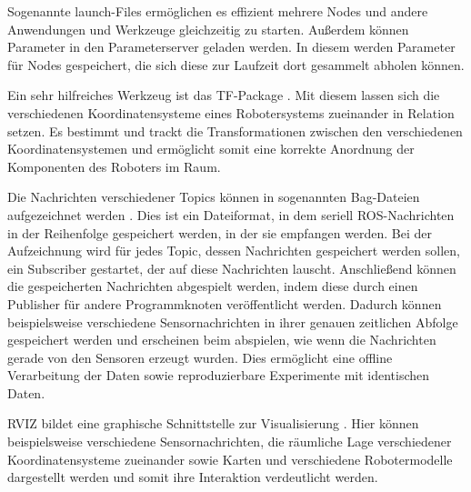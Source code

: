 Sogenannte launch-Files ermöglichen es effizient mehrere Nodes und andere Anwendungen und Werkzeuge gleichzeitig zu starten. Außerdem können Parameter in den Parameterserver geladen werden. In diesem werden Parameter für Nodes gespeichert, die sich diese zur Laufzeit dort gesammelt abholen können.

Ein sehr hilfreiches Werkzeug ist das TF-Package \cite{rostf2017}. Mit diesem lassen sich die verschiedenen Koordinatensysteme eines Robotersystems zueinander in Relation setzen. Es bestimmt und trackt die  Transformationen zwischen den verschiedenen Koordinatensystemen und ermöglicht somit eine korrekte Anordnung der Komponenten des Roboters im Raum. 

Die Nachrichten verschiedener Topics können in sogenannten Bag-Dateien auf\-ge\-zeich\-net werden \cite{rosbags2015}. Dies ist ein Dateiformat, in dem seriell ROS-Nachrichten in der Reihenfolge gespeichert werden, in der sie empfangen werden. Bei der Aufzeichnung wird für jedes Topic, dessen Nachrichten gespeichert werden sollen, ein Subscriber gestartet, der auf diese Nachrichten lauscht. Anschließend können die gespeicherten Nachrichten abgespielt werden, indem diese durch einen Publisher für andere Programmknoten veröffentlicht werden. Dadurch können beispielsweise verschiedene Sensornachrichten in ihrer genauen zeitlichen Abfolge gespeichert werden und erscheinen beim abspielen, wie wenn die Nachrichten gerade von den Sensoren erzeugt wurden. Dies ermöglicht eine offline Verarbeitung der Daten sowie reproduzierbare Experimente mit identischen Daten. 

RVIZ bildet eine graphische Schnittstelle zur Visualisierung \cite{rviz2015}. Hier können bei\-spiels\-wei\-se verschiedene Sensornachrichten, die räumliche Lage verschiedener Koordinatensysteme zueinander sowie Karten und verschiedene Robotermodelle dargestellt werden und somit ihre Interaktion verdeutlicht werden. 

